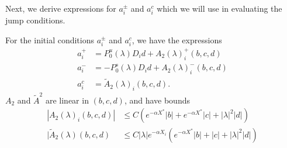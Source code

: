 \documentclass[thesis.tex]{subfiles}
\begin{document}
Next, we derive expressions for $a_i^\pm$ and $a_i^c$ which we will use in evaluating the jump conditions.

\begin{lemma}\label{lemma:aipm}
For the initial conditions $a_i^\pm$ and $a_i^c$, we have the expressions
\begin{equation}\label{aipmexp1}
\begin{aligned}
a_i^+ &= P_0^u(\lambda) D_i d + A_2(\lambda)_i^+(b, c, d) \\
a_i^- &= -P_0^s(\lambda) D_i d + A_2(\lambda)_i^-(b, c, d) \\
a_i^c &= \tilde{A}_2(\lambda)_i(b, c, d).
\end{aligned}
\end{equation}
$A_2$ and $\tilde{A}^2$ are linear in $(b, c, d)$, and have bounds
\begin{align}
|A_2(\lambda)_i(b, c, d)|
&\leq C \left(e^{-\alpha X^*}|b| + e^{-\alpha X^*}|c| + |\lambda|^2|d| \right) \label{A2bound} \\
|\tilde{A}_2(\lambda)(b, c, d) &\leq C |\lambda| e^{-\alpha X_i} \left( e^{-\alpha X^*}  |b| + |c| +|\lambda|^2 |d| \right) \label{tildeA2bound}
\end{align}


\end{lemma}
\end{document}
